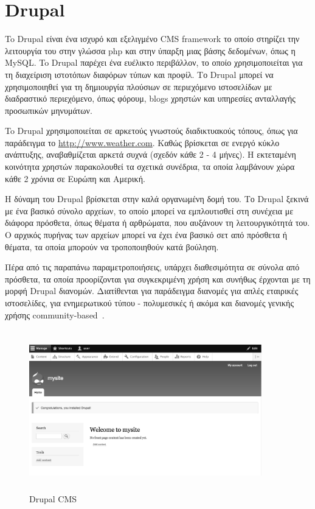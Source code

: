 \documentclass[12pt]{report}
\begin{document}
\section{\textlatin{Drupal}}
To \textlatin{Drupal} είναι ένα ισχυρό και εξελιγμένο \textlatin{CMS framework} το οποίο στηρίζει την λειτουργία του στην γλώσσα \textlatin{php} και στην ύπαρξη μιας βάσης δεδομένων, όπως η \textlatin{MySQL}. To  \textlatin{Drupal} παρέχει ένα ευέλικτο περιβάλλον, το οποίο χρησιμοποιείται για τη διαχείριση ιστοτόπων διαφόρων τύπων και προφίλ. Το \textlatin{Drupal} μπορεί να χρησιμοποιηθεί για τη δημιουργία πλούσιων σε περιεχόμενο ιστοσελίδων με διαδραστικό περιεχόμενο, όπως φόρουμ, \textlatin{blogs} χρηστών και υπηρεσίες ανταλλαγής προσωπικών μηνυμάτων.

To \textlatin{Drupal} χρησιμοποιείται σε αρκετούς γνωστούς διαδικτυακούς τόπους, όπως για παράδειγμα το \textlatin{\url{http://www.weather.com}}. Καθώς βρίσκεται σε ενεργό κύκλο ανάπτυξης, αναβαθμίζεται αρκετά συχνά (σχεδόν κάθε 2 - 4 μήνες). Η εκτεταμένη κοινότητα χρηστών παρακολουθεί τα σχετικά συνέδρια, τα οποία λαμβάνουν χώρα κάθε 2 χρόνια σε Ευρώπη και Αμερική.

Η δύναμη του \textlatin{Drupal} βρίσκεται στην καλά οργανωμένη δομή του. Το \textlatin{Drupal} ξεκινά με ένα βασικό σύνολο αρχείων, το οποίο μπορεί να εμπλουτισθεί στη συνέχεια με διάφορα πρόσθετα, όπως θέματα ή αρθρώματα, που αυξάνουν τη λειτουργικότητά του. Ο αρχικός πυρήνας των αρχείων μπορεί να έχει ένα βασικό σετ από πρόσθετα ή θέματα, τα οποία μπορούν να τροποποιηθούν κατά βούληση.

Πέρα από τις παραπάνω παραμετροποιήσεις, υπάρχει διαθεσιμότητα σε σύνολα από πρόσθετα, τα οποία προορίζονται για συγκεκριμένη χρήση και συνήθως έρχονται με τη μορφή \textlatin{Drupal} διανομών. Διατίθενται για παράδειγμα διανομές για απλές εταιρικές ιστοσελίδες, για ενημερωτικού τύπου - πολυμεσικές ή ακόμα και διανομές γενικής χρήσης \textlatin{community-based}~\cite{opensource_cms_demos_and_information}.
\begin{figure}[H]
\centering
\includegraphics[width=0.9\textwidth, height=7cm]{drupal-gray}
\caption{\textlatin{Drupal CMS}}
\label{fig:drupal}
\end{figure}
\end{document}
